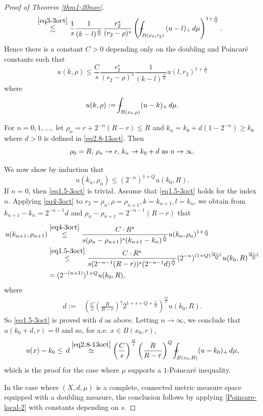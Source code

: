 \documentclass[11pt,leqno]{amsart}
\def\Xint#1{\mathchoice
	{\XXint\displaystyle\textstyle{#1}}
	{\XXint\textstyle\scriptstyle{#1}}
	{\XXint\scriptstyle\scriptscriptstyle{#1}}
	{\XXint\scriptscriptstyle\scriptscriptstyle{#1}}
	\!\int}
\def\XXint#1#2#3{{\setbox0=\hbox{$#1{#2#3}{\int}$ }
		\vcenter{\hbox{$#2#3$ }}\kern-.6\wd0}}
\def\dashint{\Xint-}
\numberwithin{equation}{section}
\theoremstyle{definition}
\begin{document}
\begin{proof}[Proof of Theorem \ref{thm1-20nov}]
\begin{align*}
			&\overset{\eqref{eq3-3oct}}{\lesssim}
			\frac{1}{s}
			\frac{1}{(k-l)^{\frac{s}{Q}}} \frac{r_2^s}{(r_{2}-\rho)^s} \left( \dashint_{B(x_0,r_2)} {(u-l)_+}\, d\mu\right)^{1+\frac{s}{Q}}.
		\end{align*}
		Hence there is a constant $C>0$  depending only  on the doubling and Poincar\'e constants such that 
		\begin{equation}\label{eq4-3oct}
			u(k,\rho)\leq \frac{C}{s}\frac{r_2^s}{(r_2-\rho)^s}\frac{1}{(k-l)^{\frac{s}{Q}}} u(l,r_2)^{1+\frac{s}{Q}}
		\end{equation}
		where
		\[
		u(k,\rho):=\dashint_{B(x_0,\rho)}(u-k)_+\,d\mu.
		\]
		
		For $n=0,1,\ldots,$ let $\rho_n=r+2^{-n}(R-r)\leq R$ and $k_n=k_0+d(1-2^{-n})\geq k_0$ where $d>0$ is defined in \eqref{eq2.8-13oct}. Then
		\[
		\rho_0=R,\, \rho_n\to r,\, k_n\to k_0+d {\rm \ as\ }n\to\infty.
		\]
		
		
		We now show by induction that 
		\begin{equation}\label{eq1.5-3oct}
			u(k_n,\rho_n)\leq (2^{-n})^{1+Q} u(k_0,R).
		\end{equation}
		If $n=0$, then \eqref{eq1.5-3oct} is trivial.
		Assume that \eqref{eq1.5-3oct} holds for the index $n$.
		Applying \eqref{eq4-3oct} 
		{to}
		$r_2=\rho_n, \rho=\rho_{n+1}, k=k_{n+1}, l=k_n$,
		we obtain from $k_{n+1}-k_n=2^{-n-1}d$ and $\rho_n-\rho_{n+1}=2^{-n-1}(R-r)$ that
		\begin{align*}
			u(k_{n+1},{\rho_{n+1}})
			&\overset{\eqref{eq4-3oct}}{\leq}  \frac{ C\cdot R^s}{s(\rho_n-\rho_{n+1})^s (k_{n+1}-k_n)^{\frac{s}{Q}}} u(k_{n}, \rho_n)^{1+\frac{s}{Q}}\\
			&\overset{\eqref{eq1.5-3oct}}{\leq } \frac{C\cdot R^s}{s(2^{-n-1} (R-r))^s (2^{-n-1}d)^{\frac{s}{Q}}} (2^{-n})^{(1+Q)\frac{Q+s}{Q}} u(k_0,R)^{\frac{Q+s}{Q}}\\
			&= (2^{-(n+1)})^{1+Q} u(k_0,R),
		\end{align*}
		where 
		\begin{align}
			d:= & \left( \frac{C}{s} \left(\frac{R}{R-r} \right)^s2^{1+s+Q+\frac{s}{Q}} \right)^{\frac{Q}{s}} u(k_0,R). \label{eq2.8-13oct}
		\end{align}
		So \eqref{eq1.5-3oct} is proved with $d$ as above.
		Letting $n\to\infty$, we conclude that $u(k_0+d,r)=0$ and so, for a.e. $x\in B(x_0,r)$,
		\begin{align}
			u(x)-k_0\leq \, d \overset{\eqref{eq2.8-13oct}}{\simeq} \left(\frac{C}{s} \right)^{\frac{Q}{s}} \left(\frac{R}{R-r}\right)^{Q}  \dashint_{B(x_0,R)}(u-k_0)_+\,d\mu \label{eq3.13-10dec},
		\end{align}
		which is the proof for the case where $\mu$ supports a $1$-Poincar\'e inequality.
		
		
		In the case where $(X,d,\mu)$ is a complete, connected metric measure space equipped with a doubling measure, the conclusion follows by applying \eqref{Poincare-local-2} with constants depending on $s$.
	\end{proof}
	
\end{document}
